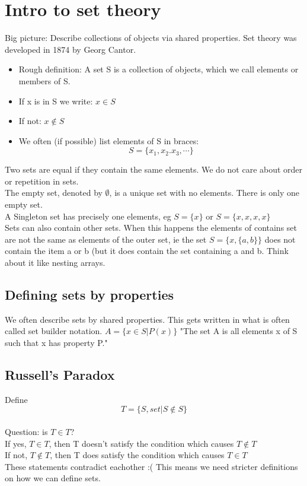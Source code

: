 \documentclass[a4paper, 11pt]{report}
\begin{document}
    \section{Intro to set theory}
    Big picture: Describe collections of objects via shared properties. Set theory was developed in 1874 by Georg Cantor.\\
    \begin{itemize}
	\item Rough definition: A set S is a collection of objects, which we call elements or members of S.
	\item If x is in S we write: \(x \in S\)
	\item If not: \(x \notin S\)
	\item We often (if possible) list elements of S in braces: \[S = \{x_{1}, x_{2}. x_{3}, \cdots \}\]
    \end{itemize}
    Two sets are equal if they contain the same elements. We do not care about order or repetition in sets. \\
    The empty set, denoted by \(\emptyset\), is a unique set with no elements. There is only one empty set. \\
    A Singleton set has precisely one elements, eg \(S = \{x\}\) or \(S = \{x, x, x, x\}\) \\
    Sets can also contain other sets. When this happens the elements of contains set are not the same as elements of the outer set, ie the set \(S = \{x, \{a, b\}\}\) does not contain the item a or b (but it does contain the set containing a and b. Think about it like nesting arrays. \\
	\subsection{Defining sets by properties}
	We often describe sets by shared properties. This gets written in what is often called set builder notation. \(A = \{x \in S | P(x)\}\) "The set A is all elements x of S such that x has property P."\\
	\subsection{Russell's Paradox}
	Define \[T = \{S, set | S \notin S\}\] \\
	Question: is \(T \in T\)?\\
	If yes, \(T \in T\), then T doesn't satisfy the condition which causes \(T \notin T\)\\
	If not, \(T \notin T\), then T does satisfy the condition which causes \(T \in T\) \\
	These statements contradict eachother :( This means we need stricter definitions on how we can define sets.\\
\end{document}
